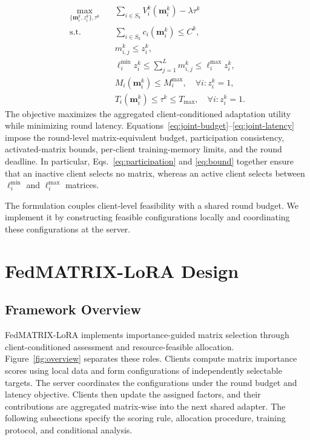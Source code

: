 \documentclass[10pt,conference,letterpaper]{IEEEtran}
\begin{document}
\begin{align}
\max_{\{\mathbf m_i^k,z_i^k\},\tau^k}
\quad&
\sum_{i\in S_k}
V_i^k(\mathbf m_i^k)
-\lambda\tau^k
\label{eq:joint-objective}\\
\text{s.t.}\quad&
\sum_{i\in S_k}
c_i(\mathbf m_i^k)
\leq C^k,
\label{eq:joint-budget}\\
&
m_{i,j}^k\leq z_i^k,
\label{eq:participation}\\
&
\ell_i^{\min}z_i^k
\leq
\sum_{j=1}^{L}m_{i,j}^k
\leq
\ell_i^{\max}z_i^k,
\label{eq:bound}\\
&
M_i(\mathbf m_i^k)
\leq M_i^{\max},
\quad
\forall i:z_i^k=1,
\label{eq:joint-memory}\\
&
T_i(\mathbf m_i^k)
\leq
\tau^k
\leq
T_{\max},
\quad
\forall i:z_i^k=1 .
\label{eq:joint-latency}
\end{align}
The objective maximizes the aggregated client-conditioned adaptation utility while minimizing round latency. Equations~\eqref{eq:joint-budget}--\eqref{eq:joint-latency} impose the round-level matrix-equivalent budget, participation consistency, activated-matrix bounds, per-client training-memory limits, and the round deadline. In particular, Eqs.~\eqref{eq:participation} and \eqref{eq:bound} together ensure that an inactive client selects no matrix, whereas an active client selects between \(\ell_i^{\min}\) and \(\ell_i^{\max}\) matrices.


The formulation couples client-level feasibility with a shared round budget. We implement it by constructing feasible configurations locally and coordinating these configurations at the server.

\section{FedMATRIX-LoRA Design}\label{Sec.alg}
\subsection{Framework Overview}
FedMATRIX-LoRA implements importance-guided matrix selection through client-conditioned assessment and resource-feasible allocation. Figure~\ref{fig:overview} separates these roles. Clients compute matrix importance scores using local data and form configurations of independently selectable targets. The server coordinates the configurations under the round budget and latency objective. Clients then update the assigned factors, and their contributions are aggregated matrix-wise into the next shared adapter. The following subsections specify the scoring rule, allocation procedure, training protocol, and conditional analysis.
\end{document}
